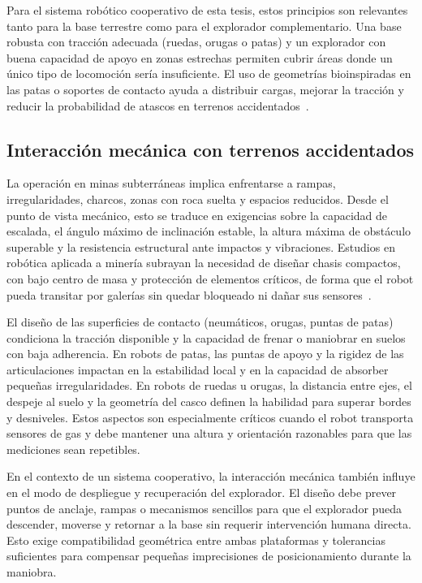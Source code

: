 Para el sistema robótico cooperativo de esta tesis, estos principios son relevantes tanto para la base terrestre como para el explorador complementario. Una base robusta con tracción adecuada (ruedas, orugas o patas) y un explorador con buena capacidad de apoyo en zonas estrechas permiten cubrir áreas donde un único tipo de locomoción sería insuficiente. El uso de geometrías bioinspiradas en las patas o soportes de contacto ayuda a distribuir cargas, mejorar la tracción y reducir la probabilidad de atascos en terrenos accidentados~\cite{James2021_InsectLegDesign}.

\subsection{Interacción mecánica con terrenos accidentados}

\hspace{1.25cm}
La operación en minas subterráneas implica enfrentarse a rampas, irregularidades, charcos, zonas con roca suelta y espacios reducidos. Desde el punto de vista mecánico, esto se traduce en exigencias sobre la capacidad de escalada, el ángulo máximo de inclinación estable, la altura máxima de obstáculo superable y la resistencia estructural ante impactos y vibraciones. Estudios en robótica aplicada a minería subrayan la necesidad de diseñar chasis compactos, con bajo centro de masa y protección de elementos críticos, de forma que el robot pueda transitar por galerías sin quedar bloqueado ni dañar sus sensores~\cite{AdvancesMining_2023}.

El diseño de las superficies de contacto (neumáticos, orugas, puntas de patas) condiciona la tracción disponible y la capacidad de frenar o maniobrar en suelos con baja adherencia. En robots de patas, las puntas de apoyo y la rigidez de las articulaciones impactan en la estabilidad local y en la capacidad de absorber pequeñas irregularidades. En robots de ruedas u orugas, la distancia entre ejes, el despeje al suelo y la geometría del casco definen la habilidad para superar bordes y desniveles. Estos aspectos son especialmente críticos cuando el robot transporta sensores de gas y debe mantener una altura y orientación razonables para que las mediciones sean repetibles.

En el contexto de un sistema cooperativo, la interacción mecánica también influye en el modo de despliegue y recuperación del explorador. El diseño debe prever puntos de anclaje, rampas o mecanismos sencillos para que el explorador pueda descender, moverse y retornar a la base sin requerir intervención humana directa. Esto exige compatibilidad geométrica entre ambas plataformas y tolerancias suficientes para compensar pequeñas imprecisiones de posicionamiento durante la maniobra.

